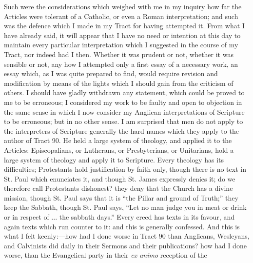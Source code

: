 Such were the considerations which weighed with me in my inquiry how
far the Articles were tolerant of a Catholic, or even a Roman
interpretation; and such was the defence which I made in my Tract for
having attempted it. From what I have already said, it will appear that
I have no need or intention at this day to maintain every particular
interpretation which I suggested in the course of my Tract, nor indeed
had I then. Whether it was prudent or not, whether it was sensible or
not, any how I attempted only a first essay of a necessary work, an
essay which, as I was quite prepared to find, would require revision and
modification by means of the lights which I should gain from the
criticism of others. I should have gladly withdrawn any statement, which
could be proved to me to be erroneous; I considered my work to be faulty
and open to objection in the same sense in which I now consider
my Anglican interpretations of Scripture to be erroneous; but in no
other sense. I am surprised that men do not apply to the
interpreters of Scripture generally the hard names which they apply to
the author of Tract 90. He held a large system of theology, and applied
it to the Articles: Episcopalians, or Lutherans, or Presbyterians, or
Unitarians, hold a large system of theology and apply it to Scripture.
Every theology has its difficulties; Protestants hold justification by
faith only, though there is no text in St. Paul which enunciates it, and
though St. James expressly denies it; do we therefore call Protestants
dishonest? they deny that the Church has a divine mission, though St.
Paul says that it is ``the Pillar and ground of Truth;'' they
keep the Sabbath, though St. Paul says, ``Let no man judge you in
meat or drink or in respect of ... the sabbath days.'' Every creed
has texts in its favour, and again texts which run counter to it: and
this is generally confessed. And this is what I felt keenly:—how had I
done worse in Tract 90 than Anglicans, Wesleyans, and Calvinists did
daily in their Sermons and their publications? how had I done worse,
than the Evangelical party in their \emph{ex animo} reception of the
